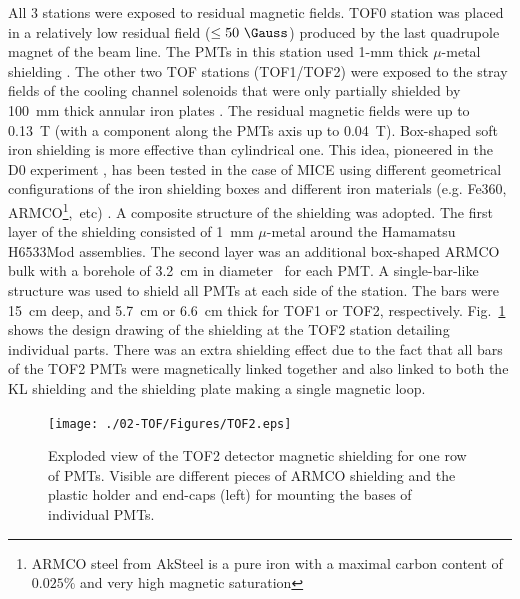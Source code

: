 
All 3 stations were exposed to residual magnetic fields. TOF0 station
was placed in a relatively low residual field ($\le 50~\Gauss$)
produced by the last quadrupole magnet of the beam line.  The PMTs in
this station used 1-mm thick $\mu$-metal shielding . The other two TOF stations (TOF1/TOF2)
were exposed to the stray fields of the cooling channel solenoids that
were only partially shielded by 100~mm thick annular iron plates
. The residual magnetic fields were up to 0.13~T (with a
component along the PMTs axis up to 0.04~T). Box-shaped soft iron
shielding is more effective than cylindrical one. This idea,
pioneered in the D0 experiment , has been
tested in the case of MICE using different geometrical configurations
of the iron shielding boxes and different iron materials (e.g. Fe360,
ARMCO\footnote{ARMCO steel from AkSteel is a pure iron with a maximal
  carbon content of $0.025\%$ and very high magnetic
  saturation},~etc) \cite{2012NIMPA.693..130B}.
A composite structure of the shielding was adopted. The first layer of
the shielding consisted of 1~mm $\mu$-metal around the Hamamatsu
H6533Mod assemblies. The second layer was an additional box-shaped
ARMCO bulk with a borehole of 3.2~cm in diameter~\cite{NOTE455} for
each PMT. A single-bar-like structure was used to shield all PMTs at
each side of the station. The bars were 15~cm deep, and 5.7~cm or
6.6~cm thick for TOF1 or TOF2, respectively.  
Fig.~\ref{fig:TOF1} shows the design drawing of the shielding at the
TOF2 station detailing individual parts. There was an extra shielding
effect due to the fact that all bars of the TOF2 PMTs were
magnetically linked together and also linked to both the KL shielding
and the shielding plate  making a
single magnetic loop.
\begin{figure}
  \begin{center}
  \texttt{[image: ./02-TOF/Figures/TOF2.eps]} \\
  \caption{Exploded view of the TOF2 detector magnetic shielding for
    one row of PMTs. Visible are different pieces of ARMCO shielding
    and the plastic holder and end-caps (left) for mounting the bases of
    individual PMTs.}
  \label{fig:TOF1}
  \end{center}
\end{figure}
